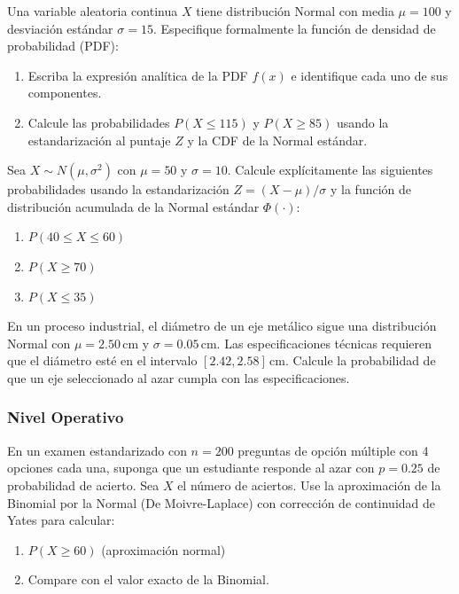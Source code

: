\begin{problema}
	\label{prob:3.9.1}
	Una variable aleatoria continua $X$ tiene distribución Normal con media $\mu = 100$ y desviación estándar $\sigma = 15$. Especifique formalmente la función de densidad de probabilidad (PDF):
	\begin{enumerate}
		\item Escriba la expresión analítica de la PDF $f(x)$ e identifique cada uno de sus componentes.
		\item Calcule las probabilidades $P(X \le 115)$ y $P(X \ge 85)$ usando la estandarización al puntaje $Z$ y la CDF de la Normal estándar.
	\end{enumerate}
\end{problema}

\begin{problema}
	\label{prob:3.9.2}
	Sea $X \sim N(\mu, \sigma^{2})$ con $\mu = 50$ y $\sigma = 10$. Calcule explícitamente las siguientes probabilidades usando la estandarización $Z = (X - \mu)/\sigma$ y la función de distribución acumulada de la Normal estándar $\Phi(\cdot)$:
	\begin{enumerate}
		\item $P(40 \le X \le 60)$
		\item $P(X \ge 70)$
		\item $P(X \le 35)$
	\end{enumerate}
\end{problema}

\begin{problema}
	\label{prob:3.9.3}
	En un proceso industrial, el diámetro de un eje metálico sigue una distribución Normal con $\mu = 2.50\,\text{cm}$ y $\sigma = 0.05\,\text{cm}$. Las especificaciones técnicas requieren que el diámetro esté en el intervalo $[2.42, 2.58]\,\text{cm}$. Calcule la probabilidad de que un eje seleccionado al azar cumpla con las especificaciones.
\end{problema}

\subsubsection*{Nivel Operativo}

\begin{problema}
	\label{prob:3.9.4}
	En un examen estandarizado con $n = 200$ preguntas de opción múltiple con 4 opciones cada una, suponga que un estudiante responde al azar con $p = 0.25$ de probabilidad de acierto. Sea $X$ el número de aciertos. Use la aproximación de la Binomial por la Normal (De Moivre-Laplace) con corrección de continuidad de Yates para calcular:
	\begin{enumerate}
		\item $P(X \ge 60)$ (aproximación normal)
		\item Compare con el valor exacto de la Binomial.
	\end{enumerate}
\end{problema}

